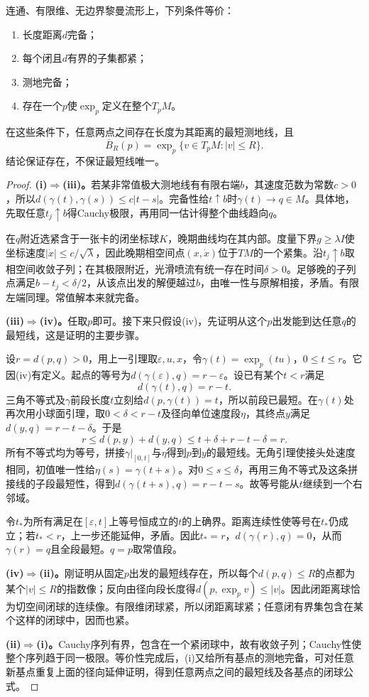 \begin{theorem}\label{thm:hopf-rinow}
连通、有限维、无边界黎曼流形上，下列条件等价：
\begin{enumerate}[label=(\roman*),nosep]
\item 长度距离$d$完备；
\item 每个闭且$d$有界的子集都紧；
\item 测地完备；
\item 存在一个$p$使$\exp_p$定义在整个$T_pM$。
\end{enumerate}
在这些条件下，任意两点之间存在长度为其距离的最短测地线，且
\[
 \overline B_R(p)=\exp_p\{v\in T_pM:|v|\leq R\}.
\]
结论保证存在，不保证最短线唯一。
\end{theorem}
\begin{proof}
\textbf{(i)$\Rightarrow$(iii)。}若某非常值极大测地线有有限右端$b$，其速度范数为常数$c>0$，所以$d(\gamma(t),\gamma(s))\leq c|t-s|$。完备性给$t\uparrow b$时$\gamma(t)\to q\in M$。具体地，先取任意$t_j\uparrow b$得Cauchy极限，再用同一估计得整个曲线趋向$q$。

在$q$附近选紧含于一张卡的闭坐标球$K$，晚期曲线均在其内部。度量下界$g\geq\lambda I$使坐标速度$|\dot x|\leq c/\sqrt\lambda$，因此晚期相空间点$(x,\dot x)$位于$TM$的一个紧集。沿$t_j\uparrow b$取相空间收敛子列；在其极限附近，光滑喷流有统一存在时间$\delta>0$。足够晚的子列点满足$b-t_j<\delta/2$，从该点出发的解便越过$b$，由唯一性与原解相接，矛盾。有限左端同理。常值解本来就完备。

\textbf{(iii)$\Rightarrow$(iv)。}任取$p$即可。接下来只假设(iv)，先证明从这个$p$出发能到达任意$q$的最短线，这是证明的主要步骤。

设$r=d(p,q)>0$，用上一引理取$\varepsilon,u,x$，令$\gamma(t)=\exp_p(tu)$，$0\leq t\leq r$。它因(iv)有定义。起点的等号为$d(\gamma(\varepsilon),q)=r-\varepsilon$。设已有某个$t<r$满足
\[
 d(\gamma(t),q)=r-t.
\]
三角不等式及$\gamma$前段长度$t$立刻给$d(p,\gamma(t))=t$，所以前段已最短。在$\gamma(t)$处再次用小球面引理，取$0<\delta<r-t$及径向单位速度段$\eta$，其终点$y$满足$d(y,q)=r-t-\delta$。于是
\[
 r\leq d(p,y)+d(y,q)\leq t+\delta+r-t-\delta=r.
\]
所有不等式均为等号，拼接$\gamma|_{[0,t]}$与$\eta$得到$p$到$y$的最短线。无角引理使接头处速度相同，初值唯一性给$\eta(s)=\gamma(t+s)$。对$0\leq s\leq\delta$，再用三角不等式及这条拼接线的子段最短性，得到$d(\gamma(t+s),q)=r-t-s$。故等号能从$t$继续到一个右邻域。

令$t_*$为所有满足在$[\varepsilon,t]$上等号恒成立的$t$的上确界。距离连续性使等号在$t_*$仍成立；若$t_*<r$，上一步还能延伸，矛盾。因此$t_*=r$，$d(\gamma(r),q)=0$，从而$\gamma(r)=q$且全段最短。$q=p$取常值段。

\textbf{(iv)$\Rightarrow$(ii)。}刚证明从固定$p$出发的最短线存在，所以每个$d(p,q)\leq R$的点都为某个$|v|\leq R$的指数像；反向由径向段长度得$d(p,\exp_pv)\leq|v|$。因此闭距离球恰为切空间闭球的连续像。有限维闭球紧，所以闭距离球紧；任意闭有界集包含在某个这样的闭球中，因而也紧。

\textbf{(ii)$\Rightarrow$(i)。}Cauchy序列有界，包含在一个紧闭球中，故有收敛子列；Cauchy性使整个序列趋于同一极限。等价性完成后，(i)又给所有基点的测地完备，可对任意新基点重复上面的径向延伸证明，得到任意两点之间的最短线及各基点的闭球公式。
\end{proof}

